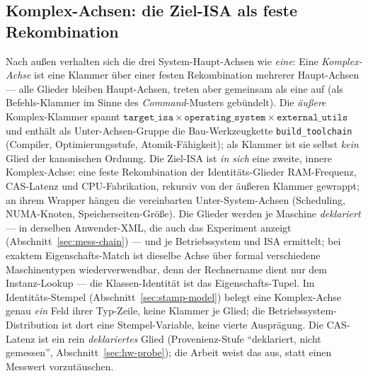 \begin{nurlang}
\subsection{Komplex-Achsen: die Ziel-ISA als feste Rekombination}\label{sec:complex-axis}
Nach außen verhalten sich die drei System-Haupt-Achsen wie \emph{eine}: Eine \emph{Komplex-Achse}
ist eine Klammer über einer festen Rekombination mehrerer Haupt-Achsen --- alle Glieder bleiben
Haupt-Achsen, treten aber gemeinsam als eine auf (als Befehls-Klammer im Sinne des
\emph{Command}-Musters gebündelt). Die \emph{äußere} Komplex-Klammer spannt
$\texttt{target\_isa} \times \texttt{operating\_system} \times \texttt{external\_utils}$ und enthält
als Unter-Achsen-Gruppe die Bau-Werkzeugkette \texttt{build\_toolchain} (Compiler, Optimierungsstufe,
Atomik-Fähigkeit); als Klammer ist sie selbst \emph{kein} Glied der
kanonischen Ordnung. Die Ziel-ISA ist \emph{in sich} eine zweite, innere Komplex-Achse: eine feste
Rekombination der Identitäts-Glieder RAM-Frequenz, CAS-Latenz und CPU-Fabrikation, rekursiv von der
äußeren Klammer gewrappt; an ihrem Wrapper hängen die vereinbarten Unter-System-Achsen (Scheduling,
NUMA-Knoten, Speicherseiten-Größe). Die Glieder werden je Maschine \emph{deklariert} --- in
derselben Anwender-XML, die auch das Experiment anzeigt (Abschnitt~\ref{sec:mess-chain}) --- und je
Betriebssystem und ISA ermittelt; bei exaktem Eigenschafts-Match ist dieselbe Achse über formal
verschiedene Maschinentypen wiederverwendbar, denn der Rechnername dient nur dem Instanz-Lookup ---
die Klassen-Identität ist das Eigenschafts-Tupel. Im Identitäts-Stempel
(Abschnitt~\ref{sec:stamp-model}) belegt eine Komplex-Achse genau \emph{ein} Feld ihrer Typ-Zeile,
keine Klammer je Glied; die Betriebssystem-Distribution ist dort eine Stempel-Variable, keine
vierte Ausprägung. Die CAS-Latenz ist ein rein \emph{deklariertes} Glied
(Provenienz-Stufe \enquote{deklariert, nicht gemessen}, Abschnitt~\ref{sec:hw-probe}); die Arbeit
weist das aus, statt einen Messwert vorzutäuschen.

\end{nurlang}
